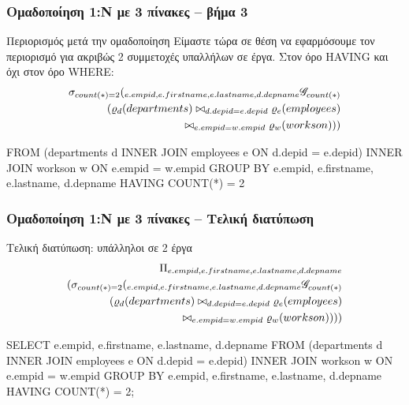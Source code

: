 \begin{frame}
\frametitle{Ομαδοποίηση 1:Ν με 3 πίνακες -- βήμα 3}
\begin{minipage}{\wE}
\begin{block}{\small Περιορισμός μετά την ομαδοποίηση}
Είμαστε τώρα σε θέση να εφαρμόσουμε τον περιορισμό
για ακριβώς 2 συμμετοχές υπαλλήλων σε έργα.
Στον όρο {\sq HAVING} και όχι στον όρο {\sq WHERE}:
\[
\begin{split}
  \sigma _{count(*) = 2}
  (
    {}_{e.empid, e.firstname, e.lastname, d.depname}  \mathscr{G}_{count(*)} \\
    (
      \varrho_{d} (departments) \bowtie_{d.depid=e.depid} \varrho_{e} (employees) \\
                               \bowtie_{e.empid=w.empid} \varrho_{w} (workson)
    )
  )
\end{split}
\]
\pause
\vspace{-0.4cm}
\en
\begin{SQL}
    FROM (departments d INNER JOIN employees e
                           ON d.depid = e.depid)
                        INNER JOIN workson w
                           ON e.empid = w.empid
GROUP BY e.empid, e.firstname, e.lastname, d.depname
  HAVING COUNT(*) = 2
\end{SQL}
\el
  \end{block}
\end{minipage}
\end{frame}


\begin{frame}
\frametitle{Ομαδοποίηση 1:Ν με 3 πίνακες -- Τελική διατύπωση}
\begin{minipage}{\wE}
\vspace{-0.5cm}
\begin{block}{\small Τελική διατύπωση: υπάλληλοι σε 2 έργα}
\[
\begin{split}
  \Pi_{e.empid, e.firstname, e.lastname, d.depname}  \\
  (
    \sigma _{count(*) = 2}
    (
      {}_{e.empid, e.firstname, e.lastname, d.depname}  \mathscr{G}_{count(*)} \\
      (
        \varrho_{d} (departments) \bowtie_{d.depid=e.depid} \varrho_{e} (employees) \\
                                  \bowtie_{e.empid=w.empid} \varrho_{w} (workson)
      )
    )
  )
\end{split}
\]
\pause
\en
\begin{SQL}
  SELECT e.empid, e.firstname, e.lastname, d.depname
    FROM (departments d INNER JOIN employees e
                           ON d.depid = e.depid)
                        INNER JOIN workson w
                           ON e.empid = w.empid
GROUP BY e.empid, e.firstname, e.lastname, d.depname
  HAVING COUNT(*) = 2;
\end{SQL}
\el
  \end{block}
\end{minipage}
\end{frame}

